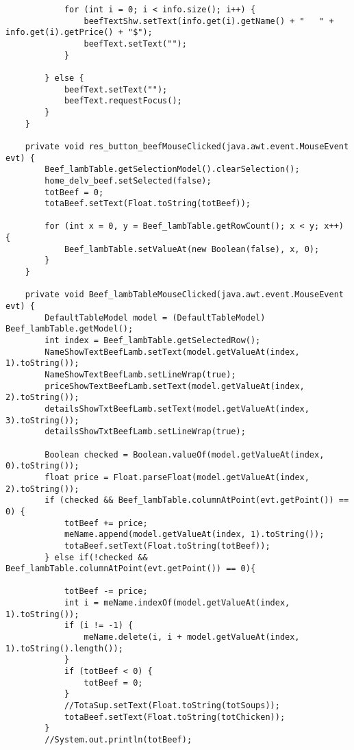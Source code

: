\documentclass[12pt,a4paper]{article}
\begin{document}
\begin{lstlisting}
            for (int i = 0; i < info.size(); i++) {
                beefTextShw.setText(info.get(i).getName() + "   " + info.get(i).getPrice() + "$");
                beefText.setText("");
            }

        } else {
            beefText.setText("");
            beefText.requestFocus();
        }
    }                                             

    private void res_button_beefMouseClicked(java.awt.event.MouseEvent evt) {                                             
        Beef_lambTable.getSelectionModel().clearSelection();
        home_delv_beef.setSelected(false);
        totBeef = 0;
        totaBeef.setText(Float.toString(totBeef));

        for (int x = 0, y = Beef_lambTable.getRowCount(); x < y; x++) {
            Beef_lambTable.setValueAt(new Boolean(false), x, 0);
        }
    }                                            

    private void Beef_lambTableMouseClicked(java.awt.event.MouseEvent evt) {                                            
        DefaultTableModel model = (DefaultTableModel) Beef_lambTable.getModel();
        int index = Beef_lambTable.getSelectedRow();
        NameShowTextBeefLamb.setText(model.getValueAt(index, 1).toString());
        NameShowTextBeefLamb.setLineWrap(true);
        priceShowTextBeefLamb.setText(model.getValueAt(index, 2).toString());
        detailsShowTxtBeefLamb.setText(model.getValueAt(index, 3).toString());
        detailsShowTxtBeefLamb.setLineWrap(true);

        Boolean checked = Boolean.valueOf(model.getValueAt(index, 0).toString());
        float price = Float.parseFloat(model.getValueAt(index, 2).toString());
        if (checked && Beef_lambTable.columnAtPoint(evt.getPoint()) == 0) {
            totBeef += price;
            meName.append(model.getValueAt(index, 1).toString());
            totaBeef.setText(Float.toString(totBeef));
        } else if(!checked && Beef_lambTable.columnAtPoint(evt.getPoint()) == 0){
            
            totBeef -= price;
            int i = meName.indexOf(model.getValueAt(index, 1).toString());
            if (i != -1) {
                meName.delete(i, i + model.getValueAt(index, 1).toString().length());
            }
            if (totBeef < 0) {
                totBeef = 0;
            }
            //TotaSup.setText(Float.toString(totSoups));
            totaBeef.setText(Float.toString(totChicken));
        }
        //System.out.println(totBeef);


\end{lstlisting}
\end{document}

